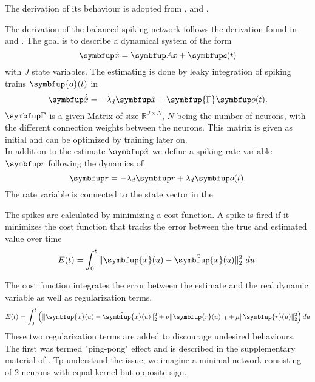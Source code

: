 The derivation of its behaviour is adopted from \cite{boerlin_predictive_2013},\cite{huang_spiking_2019} and \cite{huang_optimizing_2017}.

The derivation of the balanced spiking network follows the derivation found in \cite{boerlin_predictive_2013} and \cite{huang_dynamics_2019}.
The goal is to describe a dynamical system of the form
\begin{equation}\label{eq:x}
	\bmu{\dot{x}} = \bmu{Ax} + \bmu{c}(t)
\end{equation}
with $J$ state variables.
The estimating is done by leaky integration of spiking trains $\symbfup{o}(t)$ in
\begin{equation}\label{eq:x_hat}
	\bmu{\dot{\hat{x}}} = -\lambda_d \bmu{\hat{x}} + \symbfup{\Gamma} \bmu{o}(t).
\end{equation}
$\bmu{\Gamma}$ is a given Matrix of size $\mathbb{R}^{J\times N}$, $N$ being the number of neurons, with the different connection weights between the neurons. This matrix is given as initial and can be optimized by training later on.\\
In addition to the estimate $\bmu{\hat{x}}$ we define a spiking rate variable $\bmu{r}$ following the dynamics of
\begin{equation}\label{eq:rate}
	\bmu{\dot{r}} = -\lambda_d\bmu{r} + \lambda_d \bmu{o}(t).
\end{equation}
The rate variable is connected to the state vector in the


The spikes are calculated by minimizing a cost function. A spike is fired if it minimizes the cost function that tracks the error between the true and estimated value over time
\begin{equation}
E(t)=\int_0^t \|\symbfup{x}(u)-\hat{\symbfup{x}}(u)\|_2^2 \ du.
\end{equation}

The cost function integrates the error between the estimate and the real dynamic variable as well as regularization terms.
\begin{equation}\label{eq:cost_func}
E(t)=\int_0^t \left(\|\symbfup{x}(u)-\hat{\symbfup{x}}(u)\|_2^2+\nu\|\symbfup{r}(u)\|_1+\mu\|\symbfup{r}(u)\|_2^2\right)d u
\end{equation}
These two regularization terms are added to discourage undesired behaviours.\\
The first was termed "ping-pong" effect and is described in the supplementary material of \cite{boerlin_predictive_2013}. Tp understand the issue, we imagine a minimal network consisting of 2 neurons with equal kernel but opposite sign. \\

